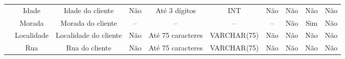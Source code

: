 \begin{table}[h]
{\begin{tabular}{|c|ccccccccc|}
                              & Idade                                                          & Idade do cliente                                                                                                          & Não                                                                                     & Até 3 dígitos                                                                                                     & INT                                                                                    & Não                                & Não                                      & Não                                    & Não               \\
                              & Morada                                                         & Morada do cliente                                                                                                         & --                                                                                      & --                                                                                                                & --                                                                                     & --                                 & Não                                      & Sim                                    & Não               \\
                              & Localidade                                                     & Localidade do cliente                                                                                                     & Não                                                                                     & Até 75 caracteres                                                                                                 & VARCHAR(75)                                                                            & Não                                & Não                                      & Não                                    & Não               \\
                              & Rua                                                            & Rua do cliente                                                                                                            & Não                                                                                     & Até 75 caracteres                                                                                                 & VARCHAR(75)                                                                            & Não                                & Não                                      & Não                                    & Não               \\

\end{tabular}}
\end{table}
